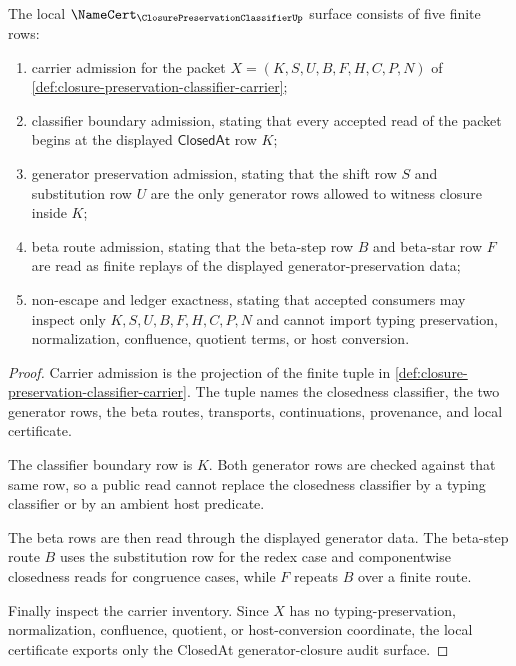 \begin{theorem}
\label{thm:closure-preservation-classifier-namecert-obligations}
The local $\NameCert_{\ClosurePreservationClassifierUp}$ surface consists of five finite rows:
\begin{enumerate}
\item carrier admission for the packet $X=(K,S,U,B,F,H,C,P,N)$ of \autoref{def:closure-preservation-classifier-carrier};
\item classifier boundary admission, stating that every accepted read of the packet begins at the displayed $\mathsf{ClosedAt}$ row $K$;
\item generator preservation admission, stating that the shift row $S$ and substitution row $U$ are the only generator rows allowed to witness closure inside $K$;
\item beta route admission, stating that the beta-step row $B$ and beta-star row $F$ are read as finite replays of the displayed generator-preservation data;
\item non-escape and ledger exactness, stating that accepted consumers may inspect only $K,S,U,B,F,H,C,P,N$ and cannot import typing preservation, normalization, confluence, quotient terms, or host conversion.
\end{enumerate}
\end{theorem}
\begin{proof}
Carrier admission is the projection of the finite tuple in \autoref{def:closure-preservation-classifier-carrier}. The tuple names the closedness classifier, the two generator rows, the beta routes, transports, continuations, provenance, and local certificate.

The classifier boundary row is $K$. Both generator rows are checked against that same row, so a public read cannot replace the closedness classifier by a typing classifier or by an ambient host predicate.

The beta rows are then read through the displayed generator data. The beta-step route $B$ uses the substitution row for the redex case and componentwise closedness reads for congruence cases, while $F$ repeats $B$ over a finite route.

Finally inspect the carrier inventory. Since $X$ has no typing-preservation, normalization, confluence, quotient, or host-conversion coordinate, the local certificate exports only the ClosedAt generator-closure audit surface.
\end{proof}

